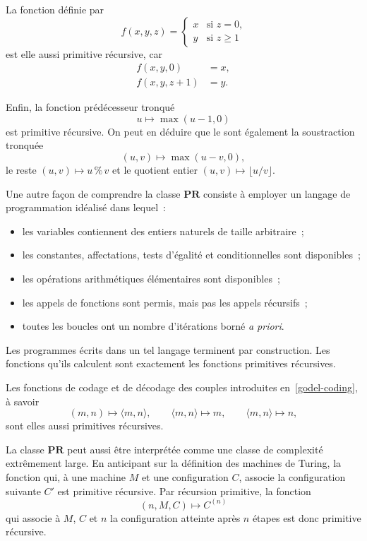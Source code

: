 La fonction définie par
\[
f(x,y,z)=
\begin{cases}
x&\text{si $z=0$,}\\
y&\text{si $z\geq1$}
\end{cases}
\]
est elle aussi primitive récursive, car
\[
\begin{aligned}
f(x,y,0)&=x,\\
f(x,y,z+1)&=y.
\end{aligned}
\]

Enfin, la fonction prédécesseur tronqué
\[
u\mapsto\max(u-1,0)
\]
est primitive récursive.  On peut en déduire que le sont également la
soustraction tronquée
\[
(u,v)\mapsto\max(u-v,0),
\]
le reste $(u,v)\mapsto u\mathbin{\%}v$ et le quotient entier
$(u,v)\mapsto\lfloor u/v\rfloor$.


\thingy Une autre façon de comprendre la classe $\mathbf{PR}$ consiste
à employer un langage de programmation idéalisé dans lequel :
\begin{itemize}
\item les variables contiennent des entiers naturels de taille
  arbitraire ;
\item les constantes, affectations, tests d'égalité et conditionnelles
  sont disponibles ;
\item les opérations arithmétiques élémentaires sont disponibles ;
\item les appels de fonctions sont permis, mais pas les appels
  récursifs ;
\item toutes les boucles ont un nombre d'itérations borné
  \textit{a priori}.
\end{itemize}
Les programmes écrits dans un tel langage terminent par construction.
Les fonctions qu'ils calculent sont exactement les fonctions
primitives récursives.

Les fonctions de codage et de décodage des couples introduites
en \ref{godel-coding}, à savoir
\[
(m,n)\mapsto\langle m,n\rangle,\qquad
\langle m,n\rangle\mapsto m,\qquad
\langle m,n\rangle\mapsto n,
\]
sont elles aussi primitives récursives.

\thingy La classe $\mathbf{PR}$ peut aussi être interprétée comme une
classe de complexité extrêmement large.  En anticipant sur la
définition des machines de Turing, la fonction qui, à une machine $M$
et une configuration $C$, associe la configuration suivante $C'$ est
primitive récursive.  Par récursion primitive, la fonction
\[
(n,M,C)\mapsto C^{(n)}
\]
qui associe à $M$, $C$ et $n$ la configuration atteinte après $n$
étapes est donc primitive récursive.


